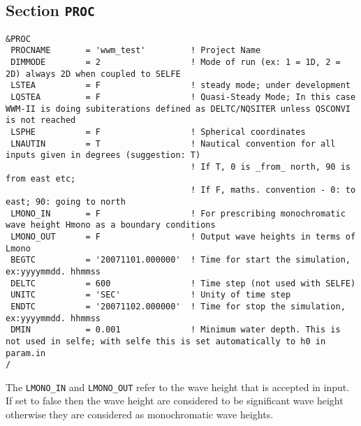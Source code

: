 \documentclass[12pt]{amsart}
\begin{document}
\subsection{Section {\tt PROC}}
\begin{verbatim}
&PROC
 PROCNAME       = 'wwm_test'         ! Project Name
 DIMMODE        = 2                  ! Mode of run (ex: 1 = 1D, 2 = 2D) always 2D when coupled to SELFE
 LSTEA          = F                  ! steady mode; under development
 LQSTEA         = F                  ! Quasi-Steady Mode; In this case WWM-II is doing subiterations defined as DELTC/NQSITER unless QSCONVI is not reached
 LSPHE          = F                  ! Spherical coordinates
 LNAUTIN        = T                  ! Nautical convention for all inputs given in degrees (suggestion: T)
                                     ! If T, 0 is _from_ north, 90 is from east etc;
                                     ! If F, maths. convention - 0: to east; 90: going to north
 LMONO_IN       = F                  ! For prescribing monochromatic wave height Hmono as a boundary conditions 
 LMONO_OUT      = F                  ! Output wave heights in terms of Lmono
 BEGTC          = '20071101.000000'  ! Time for start the simulation, ex:yyyymmdd. hhmmss
 DELTC          = 600                ! Time step (not used with SELFE)
 UNITC          = 'SEC'              ! Unity of time step
 ENDTC          = '20071102.000000'  ! Time for stop the simulation, ex:yyyymmdd. hhmmss
 DMIN           = 0.001              ! Minimum water depth. This is not used in selfe; with selfe this is set automatically to h0 in param.in
/
\end{verbatim}
The {\tt LMONO\_IN} and {\tt LMONO\_OUT} refer to the wave height that is accepted in input. If set to false then the wave height are considered to be significant wave height otherwise they are considered as monochromatic wave heights.
\end{document}
